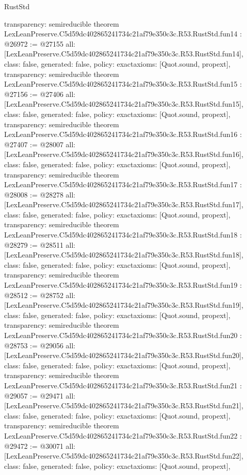 \begin{lexlean}{RustStd}
\begin{coremodule}
{  transparency: semireducible
}
theorem LexLeanPreserve.C5d59dc402865241734c21af79e350c3c.R53.RustStd.fun14 : @26972 := @27155 {
  all: [LexLeanPreserve.C5d59dc402865241734c21af79e350c3c.R53.RustStd.fun14],
  class: false,
  generated: false,
  policy: exact{axioms: [Quot.sound, propext]},
  transparency: semireducible
}
theorem LexLeanPreserve.C5d59dc402865241734c21af79e350c3c.R53.RustStd.fun15 : @27156 := @27406 {
  all: [LexLeanPreserve.C5d59dc402865241734c21af79e350c3c.R53.RustStd.fun15],
  class: false,
  generated: false,
  policy: exact{axioms: [Quot.sound, propext]},
  transparency: semireducible
}
theorem LexLeanPreserve.C5d59dc402865241734c21af79e350c3c.R53.RustStd.fun16 : @27407 := @28007 {
  all: [LexLeanPreserve.C5d59dc402865241734c21af79e350c3c.R53.RustStd.fun16],
  class: false,
  generated: false,
  policy: exact{axioms: [Quot.sound, propext]},
  transparency: semireducible
}
theorem LexLeanPreserve.C5d59dc402865241734c21af79e350c3c.R53.RustStd.fun17 : @28008 := @28278 {
  all: [LexLeanPreserve.C5d59dc402865241734c21af79e350c3c.R53.RustStd.fun17],
  class: false,
  generated: false,
  policy: exact{axioms: [Quot.sound, propext]},
  transparency: semireducible
}
theorem LexLeanPreserve.C5d59dc402865241734c21af79e350c3c.R53.RustStd.fun18 : @28279 := @28511 {
  all: [LexLeanPreserve.C5d59dc402865241734c21af79e350c3c.R53.RustStd.fun18],
  class: false,
  generated: false,
  policy: exact{axioms: [Quot.sound, propext]},
  transparency: semireducible
}
theorem LexLeanPreserve.C5d59dc402865241734c21af79e350c3c.R53.RustStd.fun19 : @28512 := @28752 {
  all: [LexLeanPreserve.C5d59dc402865241734c21af79e350c3c.R53.RustStd.fun19],
  class: false,
  generated: false,
  policy: exact{axioms: [Quot.sound, propext]},
  transparency: semireducible
}
theorem LexLeanPreserve.C5d59dc402865241734c21af79e350c3c.R53.RustStd.fun20 : @28753 := @29056 {
  all: [LexLeanPreserve.C5d59dc402865241734c21af79e350c3c.R53.RustStd.fun20],
  class: false,
  generated: false,
  policy: exact{axioms: [Quot.sound, propext]},
  transparency: semireducible
}
theorem LexLeanPreserve.C5d59dc402865241734c21af79e350c3c.R53.RustStd.fun21 : @29057 := @29471 {
  all: [LexLeanPreserve.C5d59dc402865241734c21af79e350c3c.R53.RustStd.fun21],
  class: false,
  generated: false,
  policy: exact{axioms: [Quot.sound, propext]},
  transparency: semireducible
}
theorem LexLeanPreserve.C5d59dc402865241734c21af79e350c3c.R53.RustStd.fun22 : @29472 := @30071 {
  all: [LexLeanPreserve.C5d59dc402865241734c21af79e350c3c.R53.RustStd.fun22],
  class: false,
  generated: false,
  policy: exact{axioms: [Quot.sound, propext]},
}
\end{coremodule}
\end{lexlean}
